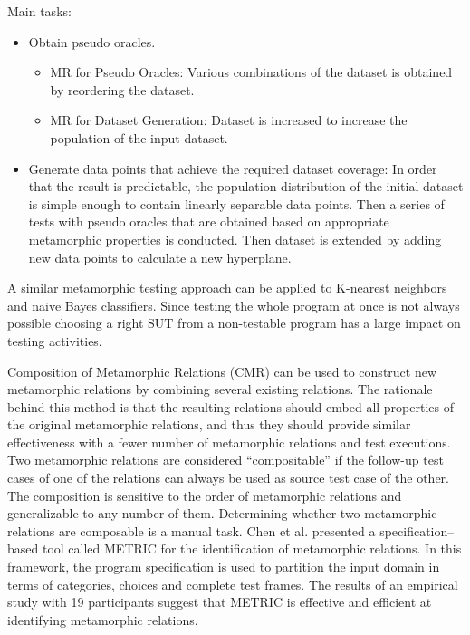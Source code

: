 Main tasks:
\begin{itemize}
  \item Obtain pseudo oracles.
  \begin{itemize}
    \item MR for Pseudo Oracles: Various combinations of the dataset is obtained by reordering the dataset.
    \item MR for Dataset Generation: Dataset is increased to increase the population of the input dataset.
  \end{itemize}
  \item Generate data points that achieve the required dataset coverage: In order that the result is predictable, the population distribution of the initial dataset is simple enough to contain linearly separable data points. Then a series of tests with pseudo oracles that are obtained based on appropriate metamorphic properties is conducted. Then dataset is extended by adding new data points to calculate a new hyperplane.
\end{itemize}
A similar metamorphic testing approach can be applied to K-nearest neighbors and naive Bayes classifiers. Since testing the whole program at once is not always possible choosing a right SUT from a non-testable program has a large impact on testing activities.


\cite{Segura2016}
Composition of Metamorphic Relations (CMR) can be used to construct new metamorphic relations by combining several existing relations. The rationale behind this method is that the resulting relations should embed all properties of the original metamorphic relations, and thus they should provide similar effectiveness with a fewer number of metamorphic relations and test executions. Two metamorphic relations are considered “compositable” if the follow-up test cases of one of the relations can always be used as source test case of the other. The composition is sensitive to the order of metamorphic relations and generalizable to any number of them. Determining whether two metamorphic relations are composable is a manual task. Chen et al. \cite{Chen2016} presented a specification–based tool called METRIC for the identification of metamorphic relations. In this framework, the program specification is used to partition the input domain in terms of categories, choices and complete test frames. The results of an empirical study with 19 participants suggest that METRIC is effective and efficient at identifying metamorphic relations.